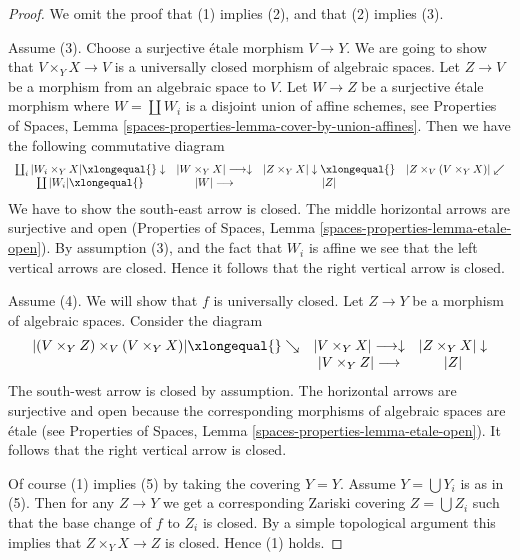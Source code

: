 \begin{proof}
We omit the proof that (1) implies (2), and that (2) implies (3).

\medskip\noindent
Assume (3). Choose a surjective \'etale morphism $V \to Y$.
We are going to show that $V \times_Y X \to V$ is a universally
closed morphism of algebraic spaces. Let $Z \to V$ be a morphism
from an algebraic space to $V$. Let $W \to Z$ be a surjective \'etale
morphism where $W = \coprod W_i$ is a disjoint union of affine schemes, see
Properties of Spaces,
Lemma \ref{spaces-properties-lemma-cover-by-union-affines}.
Then we have the following commutative diagram
$$
\begin{array}{cccc}\coprod_i |W_i \times_Y X| \xlongequal{}\downarrow & |W \times_Y X| \longrightarrow\downarrow & |Z \times_Y X| \downarrow\xlongequal{} & |Z \times_V (V \times_Y X)| \swarrow \\ \coprod |W_i| \xlongequal{} & |W| \longrightarrow & |Z| & \end{array}
$$
We have to show the south-east arrow is closed. The middle horizontal
arrows are surjective and open
(Properties of Spaces, Lemma \ref{spaces-properties-lemma-etale-open}).
By assumption (3), and the fact that
$W_i$ is affine we see that the left vertical arrows are closed. Hence
it follows that the right vertical arrow is closed.

\medskip\noindent
Assume (4). We will show that $f$ is universally closed.
Let $Z \to Y$ be a morphism of algebraic spaces. Consider the
diagram
$$
\begin{array}{ccc}|(V \times_Y Z) \times_V (V \times_Y X)| \xlongequal{}\searrow & |V \times_Y X| \longrightarrow\downarrow & |Z \times_Y X| \downarrow \\  & |V \times_Y Z| \longrightarrow & |Z|\end{array}
$$
The south-west arrow is closed by assumption. The horizontal arrows are
surjective and open because the corresponding morphisms of
algebraic spaces are \'etale (see
Properties of Spaces, Lemma \ref{spaces-properties-lemma-etale-open}).
It follows that the right vertical arrow is closed.

\medskip\noindent
Of course (1) implies (5) by taking the covering $Y = Y$.
Assume $Y = \bigcup Y_i$ is as in (5). Then for any $Z \to Y$
we get a corresponding Zariski covering $Z = \bigcup Z_i$ such that
the base change of $f$ to $Z_i$ is closed. By a simple topological
argument this implies that $Z \times_Y X \to Z$ is closed. Hence (1) holds.
\end{proof}

